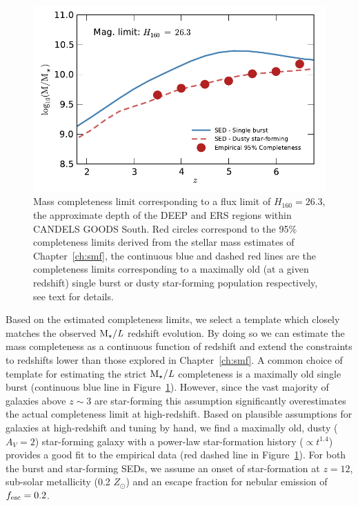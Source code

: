 \begin{figure}
\centering
	\includegraphics[width=0.8\columnwidth]{plots/MassCompleteness.pdf}
  \caption[]{Mass completeness limit corresponding to a flux limit of $H_{160} = 26.3$, the approximate depth of the DEEP and ERS regions within CANDELS GOODS South. Red circles correspond to the 95\% completeness limits derived from the stellar mass estimates of Chapter~\ref{ch:smf}, the continuous blue and dashed red lines are the completeness limits corresponding to a maximally old (at a given redshift) single burst or dusty star-forming population respectively, see text for details.}
  \label{fig:mass_comp}
\end{figure}

Based on the estimated completeness limits, we select a \citet{Bruzual:2003ckb} template which closely matches the observed $\text{M}_{\star}/\textit{L}$ redshift evolution. By doing so we can estimate the mass completeness as a continuous function of redshift and extend the constraints to redshifts lower than those explored in Chapter~\ref{ch:smf}. A common choice of template for estimating the strict $\text{M}_{\star}/\textit{L}$ completeness is a maximally old single burst (continuous blue line in Figure~\ref{fig:mass_comp}). However, since the vast majority of galaxies above $z\sim3$ are star-forming this assumption significantly overestimates the actual completeness limit at high-redshift. Based on plausible assumptions for galaxies at high-redshift and tuning by hand, we find a maximally old, dusty ($A_{V} = 2$) star-forming galaxy with a power-law star-formation history ($\propto t^{1.4}$) provides a good fit to the empirical data (red dashed line in Figure~\ref{fig:mass_comp}). For both the burst and star-forming SEDs, we assume an onset of star-formation at $z = 12$, sub-solar metallicity (0.2 $Z_{\odot}$) and an escape fraction for nebular emission of $f_{\rm{esc}} = 0.2$.

